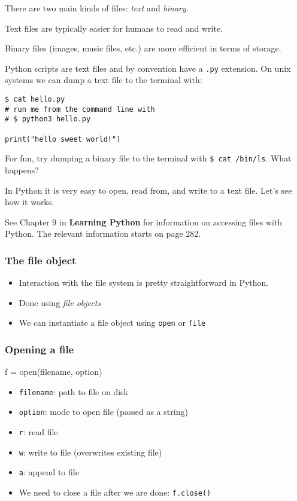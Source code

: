 \documentclass[12pt]{article} \newif\ifsolution\solutiontrue %
\begin{document}
There are two main kinds of files: \emph{text} and \emph{binary}.

Text files are typically easier for humans to read and write.

Binary files (images, music files, etc.) are more efficient in terms of
storage.

Python scripts are text files and by convention have a \texttt{.py}
extension. On unix systems we can dump a text file to the terminal with:

\begin{verbatim}
$ cat hello.py
# run me from the command line with
# $ python3 hello.py

print("hello sweet world!")
\end{verbatim}

For fun, try dumping a binary file to the terminal with
\texttt{\$\ cat\ /bin/ls}. What happens?

In Python it is very easy to open, read from, and write to a text file.
Let's see how it works.

See Chapter 9 in \textbf{Learning Python} for information on accessing
files with Python. The relevant information starts on page 282.

\subsubsection{The file object}\label{the-file-object}

\begin{itemize}
\item
  Interaction with the file system is pretty straightforward in Python.
\item
  Done using \emph{file objects}
\item
  We can instantiate a file object using \texttt{open} or \texttt{file}
\end{itemize}

\subsubsection{Opening a file}\label{opening-a-file}

\begin{python}
f = open(filename, option)
\end{python}

\begin{itemize}
\item
  \texttt{filename}: path to file on disk
\item
  \texttt{option}: mode to open file (passed as a string)
\item
  \texttt{\textquotesingle{}r\textquotesingle{}}: read file
\item
  \texttt{\textquotesingle{}w\textquotesingle{}}: write to file
  (overwrites existing file)
\item
  \texttt{\textquotesingle{}a\textquotesingle{}}: append to file
\item
  We need to close a file after we are done: \texttt{f.close()}
\end{itemize}
\end{document}
